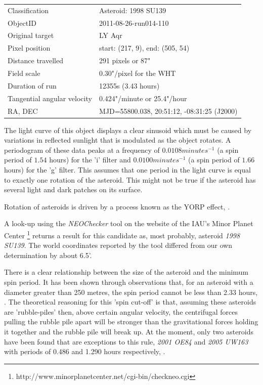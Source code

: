 \begin{tabular}{l l}
  Classification & Asteroid: 1998 SU139 \\
  ObjectID & 2011-08-26-run014-110 \\
  Original target & LY Aqr \\
  Pixel position & start: (217, 9), end: (505, 54) \\
  Distance travelled & 291 pixels or 87" \\
  Field scale & 0.30"/pixel for the WHT\\
  Duration of run & 12355s (3.43 hours) \\
  Tangential angular velocity & 0.424"/minute or 25.4"/hour\\ 
  RA, DEC & MJD=55800.038, 20:51:12, -08:31:25 (J2000) \\
\end{tabular}


The light curve of this object displays a clear sinusoid which must be caused by variations in reflected sunlight that is modulated as the object rotates. A periodogram of these data peaks at a frequency of $0.0108 minutes^{-1}$ (a spin period of $1.54$ hours) for the 'i' filter and $0.0100 minutes^{-1}$ (a spin period of $1.66$ hours) for the 'g' filter. This assumes that one period in the light curve is equal to exactly one rotation of the asteroid. This might not be true if the asteroid has several light and dark patches on its surface. 

Rotation of asteroids is driven by a process known as the YORP effect, \citep{yorpeffect}. 

A look-up using the \emph{NEOChecker} tool on the website of the IAU's Minor Planet Center \footnote{http://www.minorplanetcenter.net/cgi-bin/checkneo.cgi} returns a result for this candidate as, most probably, asteroid \emph{1998 SU139}. The world coordinates reported by the tool differed from our own determination by about 6.5'. 

There is a clear relationship between the size of the asteroid and the minimum spin period. It has been shown through observations that, for an asteroid with a diameter greater than 250 metres, the spin period cannot be less than 2.33 hours, \citep{Jacobson2014}. The theoretical reasoning for this 'spin cut-off'  is that, assuming these asteroids are 'rubble-piles' then, above certain angular velocity, the centrifugal forces pulling the rubble pile apart will be stronger than the gravitational forces holding it together and the rubble pile will break up. At the moment, only two asteroids have been found that are exceptions to this rule, \emph{2001 OE84} and \emph{2005 UW163} with periods of 0.486 and 1.290 hours respectively, \citep{Chang2014}. 

